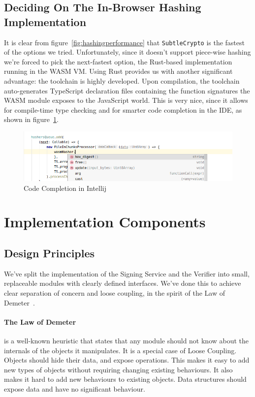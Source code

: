 \subsection{Deciding On The In-Browser Hashing Implementation}
\label{subsec:deciding-on-the-in-browser-hashing-implementation}
It is clear from figure~\ref{fig:hashingperformance} that \texttt{SubtleCrypto} is the fastest of the options we tried.
Unfortunately, since it doesn't support piece-wise hashing we're forced to pick the next-fastest option,
the Rust-based implementation running in the \gls{WASM} \gls{VM}.
Using Rust provides us with another significant advantage:
the toolchain is highly developed.
Upon compilation, the toolchain auto-generates TypeScript declaration files containing the function signatures
the \gls{WASM} module exposes to the JavaScript world.
This is very nice, since it allows for compile-time type checking and for smarter code completion in the \gls{IDE},
as shown in figure~\ref{fig:dtside}.

\begin{figure}
    \begin{center}
        \includegraphics[width=0.7\linewidth]{images/dtside.png}
        \caption{Code Completion in Intellij}
        \label{fig:dtside}
    \end{center}
\end{figure}


\section{Implementation Components}\label{sec:implementation-components}
\subsection{Design Principles}\label{subsec:design-principles}
We've split the implementation of the Signing Service and the Verifier into small,
replaceable modules with clearly defined interfaces.
We've done this to achieve clear separation of concern and loose coupling,
in the spirit of the Law of Demeter~\cite{demeter}.

\paragraph{The Law of Demeter} is a well-known heuristic that states that any module should not know about the
internals of the objects it manipulates.
It is a special case of Loose Coupling.
Objects should hide their data, and expose operations.
This makes it easy to add new types of objects without requiring changing existing behaviours.
It also makes it hard to add new behaviours to existing objects.
Data structures should expose data and have no significant behaviour.

